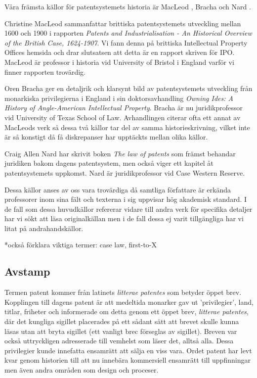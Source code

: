 Våra främsta källor för patentsystemets historia är MacLeod \cite{macleod},
Bracha \cite{bracha} och Nard \cite{nard}.

Christine MacLeod sammanfattar brittiska patentsystemets utveckling mellan 
1600 och 1900 i rapporten \emph{Patents and Industrialisation - An Historical 
Overview of the British Case, 1624-1907}. Vi fann denna på brittiska 
Intellectual Property Offices hemsida och drar slutsatsen att detta är en 
rapport skriven för IPO. MacLeod är professor i historia vid University of 
Bristol i England varför vi finner rapporten trovärdig.

Oren Bracha ger en detaljrik och klarsynt bild av patentsystemets utveckling 
från monarkiska privilegierna i England i sin doktorsavhandling \emph{Owning 
Ides: A History of Angle-American Intellectual Property}. Bracha är nu 
juridikprofessor vid University of Texas School of Law. Avhandlingen citerar 
ofta ett annat av MacLeods verk så dessa två källor tar del av samma 
historieskrivning, vilket inte är så konstigt då få diskrepanser har upptäckts 
mellan olika källor.

Craig Allen Nard har skrivit boken \emph{The law of patents} som främst 
behandar juridiken bakom dagens patentsystem, men också viger ett kapitel åt 
patentsystemets uppkomst. Nard är juridikprofessor vid Case Western Reserve.

Dessa källor anses av oss vara trovärdiga då samtliga författare är erkända 
professorer inom sina fält och texterna i sig uppvisar hög akademisk standard. 
I de fall som dessa huvudkällor refererar vidare till andra verk för 
specifika detaljer har vi sökt att läsa originalkällan men i de fall dessa ej 
varit tillgängliga har vi litat på andrahandskällor.

*också förklara viktiga termer: case law, first-to-X


\subsection{Avstamp}

Termen patent kommer från latinets \emph{litterae patentes} som
betyder öppet brev. Kopplingen till dagens patent är att medeltida monarker gav
ut 'privilegier', land, titlar, friheter och informerade om detta genom ett
öppet brev, \emph{litterae patentes}, där det kungliga sigillet placerades på
ett sådant sätt att brevet skulle kunna läsas utan att bryta sigillet\cite{blackstone} (ett vanligt brec förseglas av sigillet). Breven var också uttryckligen adresserade till 
vemhelst som läser det, alltså alla. Dessa privilegier kunde innefatta ensamrätt
att sälja en viss vara. Ordet patent har levt kvar genom historien till 
att nu innebära kommersiell ensamrätt till uppfinningar men även andra områden som design och proceser. 

